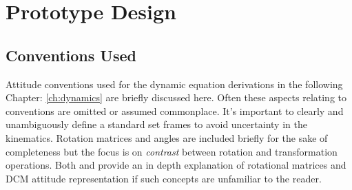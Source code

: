 \chapter{Prototype Design}
\label{ch:proto}
\section{Conventions Used}
\label{sec:proto.conventions}
Attitude conventions used for the dynamic equation derivations in the following Chapter: \ref{ch:dynamics} are briefly discussed here. Often these aspects relating to conventions are omitted or assumed commonplace. It's important to clearly and unambiguously define a standard set frames to avoid uncertainty in the kinematics. Rotation matrices and angles are included briefly for the sake of completeness but the focus is on \emph{contrast} between rotation and transformation operations. Both \cite{spacecraftattitutdequaternions} and \cite{rigidbodylecture} provide an in depth explanation of rotational matrices and DCM attitude representation if such concepts are unfamiliar to the reader.

